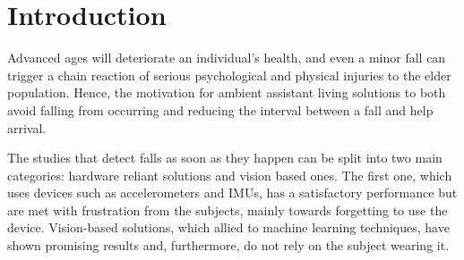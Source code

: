 \documentclass[conference]{IEEEtran}
\begin{document}
\section{Introduction}
Advanced ages will deteriorate an individual's health, and even a minor fall can trigger a chain reaction of serious psychological and physical injuries to the elder population. Hence, the motivation for ambient assistant living solutions to both avoid falling from occurring and reducing the interval between a fall and help arrival.\par
The studies that detect falls as soon as they happen can be split into two main categories: hardware reliant solutions and vision based ones. The first one, which uses devices such as accelerometers and IMUs, has a satisfactory performance but are met with frustration from the subjects, mainly towards forgetting to use the device. Vision-based solutions, which allied to machine learning techniques, have shown promising results and, furthermore, do not rely on the subject wearing it.\par
\end{document}
